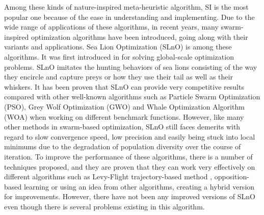 \documentclass[../main.tex]{subfiles}
\begin{document}
	Among these kinds of nature-inspired meta-heuristic algorithm, SI is the most popular one because of the ease in understanding and implementing. Due to the wide range of applications of these algorithms, in recent years, many swarm-inspired optimization algorithms have been introduced, going along with their variants and applications. Sea Lion Optimization (SLnO) is among these algorithms. It was first introduced in \cite{masadeh2019sea} for solving global-scale optimization problems. SLnO imitates the hunting behaviors of sea lions consisting of the way they encircle and capture preys or how they use their tail as well as their whiskers. It has been proven that SLnO can provide very competitive results compared with other well-known algorithms such as Particle Swarm Optimization (PSO), Grey Wolf Optimization (GWO) and Whale Optimization Algorithm (WOA) when working on different benchmark functions. However, like many other methods in swarm-based optimization, SLnO still faces demerits with regard to slow convergence speed, low precision and easily being stuck into local minimums due to the degradation of population diversity over the course of iteration. To improve the performance of these algorithms, there is a number of techniques proposed, and they are proven that they can work very effectively on different algorithms such as Levy-Flight trajectory-based method \cite{chawla2018levy}, opposition-based learning \cite{wang2011enhanced} \cite{omran2010improving} \cite{wang2016opposition} or using an idea from other algorithms, creating a hybrid version for improvements. However, there have not been any improved versions of SLnO even though there is several problems existing in this algorithm.
\end{document}
